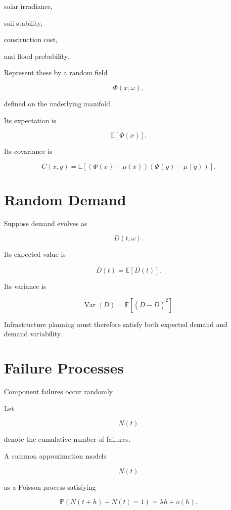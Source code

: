 \documentclass[11pt,fleqn]{book}
\numberwithin{equation}{chapter}
\theoremstyle{plain}
\theoremstyle{definition}
\theoremstyle{remark}
\begin{document}
solar irradiance,

soil stability,

construction cost,

and flood probability.

Represent these by a random field

\[
\Phi(x,\omega),
\]

defined on the underlying manifold.


Its expectation is

\[
\mathbb E[\Phi(x)].
\]

Its covariance is

\[
C(x,y)
=
\mathbb E
\left[
(\Phi(x)-\mu(x))
(\Phi(y)-\mu(y))
\right].
\]


\section{Random Demand}

Suppose demand evolves as

\[
D(t,\omega).
\]

Its expected value is

\[
\bar D(t)
=
\mathbb E[D(t)].
\]

Its variance is

\[
\operatorname{Var}(D)
=
\mathbb E[(D-\bar D)^2].
\]

Infrastructure planning must therefore satisfy both expected demand and
demand variability.


\section{Failure Processes}

Component failures occur randomly.

Let

\[
N(t)
\]

denote the cumulative number of failures.

A common approximation models

\[
N(t)
\]

as a Poisson process satisfying

\[
\mathbb P(N(t+h)-N(t)=1)
=
\lambda h
+
o(h).
\]
\end{document}
